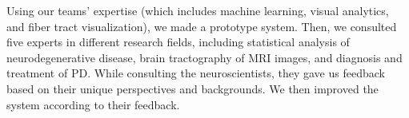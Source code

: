 Using our teams' expertise (which includes machine learning, visual analytics, and fiber tract visualization), we made a prototype system.
Then, we consulted five experts in different research fields, including statistical analysis of neurodegenerative disease, brain tractography of MRI images, and diagnosis and treatment of PD. While consulting the neuroscientists, they gave us feedback based on their unique perspectives and backgrounds. We then improved the system according to their feedback. 



	
	
	

